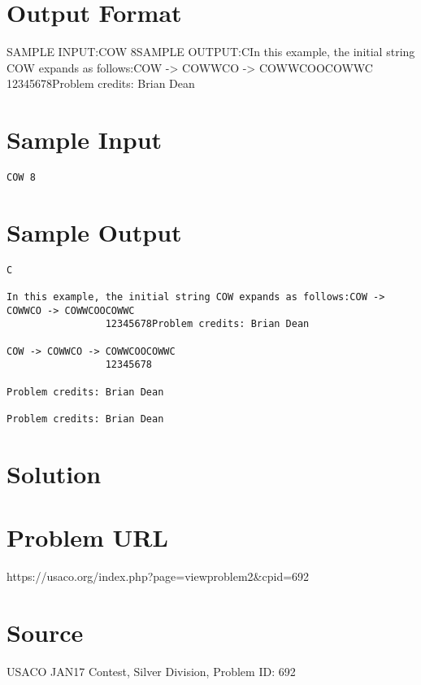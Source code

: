 \documentclass[12pt]{article}
\begin{document}
\section*{Output Format}
SAMPLE INPUT:COW 8SAMPLE OUTPUT:CIn this example, the initial string COW expands as follows:COW -> COWWCO -> COWWCOOCOWWC
                 12345678Problem credits: Brian Dean

\section*{Sample Input}
\begin{verbatim}
COW 8
\end{verbatim}

\section*{Sample Output}
\begin{verbatim}
C

In this example, the initial string COW expands as follows:COW -> COWWCO -> COWWCOOCOWWC
                 12345678Problem credits: Brian Dean

COW -> COWWCO -> COWWCOOCOWWC
                 12345678

Problem credits: Brian Dean

Problem credits: Brian Dean
\end{verbatim}

\section*{Solution}


\section*{Problem URL}
https://usaco.org/index.php?page=viewproblem2&cpid=692

\section*{Source}
USACO JAN17 Contest, Silver Division, Problem ID: 692
\end{document}
